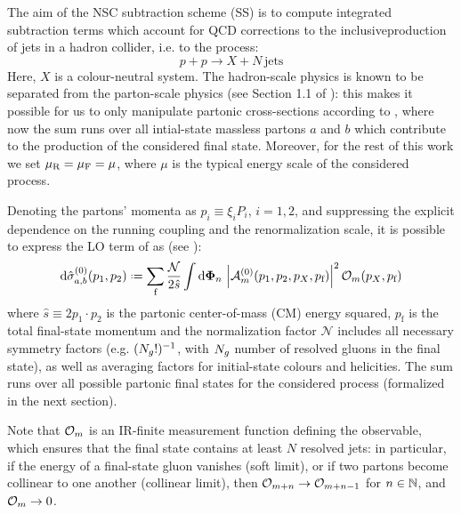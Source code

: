 
The aim of the NSC subtraction scheme (SS) is to compute integrated subtraction terms which account for QCD corrections to the inclusive\footnotemark production of jets in a hadron collider, i.e. to the process:
\begin{equation}
  p + p \rightarrow X + N \,\text{jets}
\end{equation}
Here, $ X $ is a colour-neutral system. The hadron-scale physics is known to be separated from the parton-scale physics (see Section 1.1 of \cite{Collins-2011}): this makes it possible for us to only manipulate partonic cross-sections according to , where now the sum runs over all intial-state massless partons $ a $ and $ b $ which contribute to the production of the considered final state. Moreover, for the rest of this work we set $ \mu_\text{R} = \mu_\text{F} = \mu $, where $ \mu $ is the typical energy scale of the considered process.


Denoting the partons' momenta as $ p_i \equiv \xi_i P_i $, $ i = 1,2 $, and suppressing the explicit dependence on the running coupling and the renormalization scale, it is possible to express the LO term of  as (see ):
\begin{equation}
  \dd\pcs_{a,b}^{(0)}(p_1 , p_2) \defeq \sum_\text{f} \frac{\mathcal{N}}{2\hat{s}} \int \lps_n \, \abs{\ampl^{(0)}_m(p_1, p_2, p_X, p_\text{f})}^2 \op_m(p_X, p_\text{f})
  \label{eq:ds-lo}
\end{equation}
where $ \hat{s} \equiv 2 p_1 \cdot p_2 $ is the partonic center-of-mass (CM) energy squared, $ p_\text{f} $ is the total final-state momentum and the normalization factor $ \mathcal{N} $ includes all necessary symmetry factors (e.g. $ (N_g!)^{-1} $, with $ N_g $ number of resolved gluons in the final state), as well as averaging factors for initial-state colours and helicities. The sum runs over all possible partonic final states for the considered process (formalized in the next section).

Note that $ \mathcal{O}_m $ is an IR-finite measurement function defining the observable, which ensures that the final state contains at least $ N $ resolved jets: in particular, if the energy of a final-state gluon vanishes (soft limit), or if two partons become collinear to one another (collinear limit), then $ \mathcal{O}_{m + n} \rightarrow \mathcal{O}_{m + n - 1} $ for $ n \in \mathbb{N} $, and $ \mathcal{O}_m \rightarrow 0 $.

